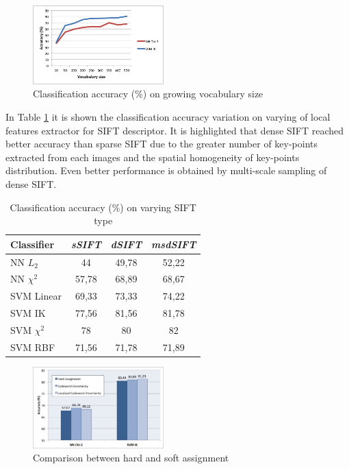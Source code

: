 \begin{figure}[h]
\begin{center}
\includegraphics[width=0.45\textwidth]{images/vocabulary.png}
\end{center}
  \caption{Classification accuracy (\%) on growing vocabulary size}
\label{fig:vocabulary}
\end{figure}

In Table \ref{tab:sifttype} it is shown the classification accuracy variation on varying of local features extractor for SIFT descriptor. It is highlighted that dense SIFT reached better accuracy than sparse SIFT due to the greater number of key-points extracted from each images and the spatial homogeneity of key-points distribution. Even better performance is obtained by multi-scale sampling of dense SIFT. 

\begin{table}[h]
\begin{center}
\begin{tabular}{|l|c|c|c|}
\hline
Classifier & \emph{sSIFT} & \emph{dSIFT} & \emph{msdSIFT}\\
\hline\hline
NN $L_2$ & 44 & 49,78 & 52,22\\
NN $\chi^2$ & 57,78 & 68,89 & 68,67\\
SVM Linear & 69,33 & 73,33 & 74,22\\
SVM IK & 77,56 & 81,56 & 81,78\\
SVM $\chi^2$ & 78 & 80 & 82\\
SVM RBF & 71,56 & 71,78 & 71,89 \\
\hline
\end{tabular}
\end{center}
\label{tab:sifttype}
\caption{Classification accuracy (\%) on varying SIFT type}
\end{table}




\begin{figure}[h]
\begin{center}
\includegraphics[width=0.45\textwidth]{images/soft-comparison.png}
\end{center}
  \caption{Comparison between hard and soft assignment}
\label{fig:vocabulary}
\end{figure}




